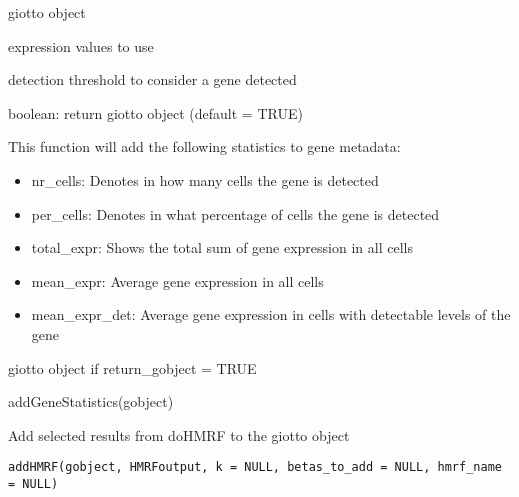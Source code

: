 \documentclass[a4paper]{book}
\begin{document}
%
\begin{Arguments}
\begin{ldescription}
\item[\code{gobject}] giotto object

\item[\code{expression\_values}] expression values to use

\item[\code{detection\_threshold}] detection threshold to consider a gene detected

\item[\code{return\_gobject}] boolean: return giotto object (default = TRUE)
\end{ldescription}
\end{Arguments}
%
\begin{Details}\relax
This function will add the following statistics to gene metadata:
\begin{itemize}

\item{} nr\_cells: Denotes in how many cells the gene is detected
\item{} per\_cells: Denotes in what percentage of cells the gene is detected
\item{} total\_expr: Shows the total sum of gene expression in all cells
\item{} mean\_expr: Average gene expression in all cells
\item{} mean\_expr\_det: Average gene expression in cells with detectable levels of the gene

\end{itemize}

\end{Details}
%
\begin{Value}
giotto object if return\_gobject = TRUE
\end{Value}
%
\begin{Examples}
\begin{ExampleCode}
    addGeneStatistics(gobject)
\end{ExampleCode}
\end{Examples}
%
\begin{Description}\relax
Add selected results from doHMRF to the giotto object
\end{Description}
%
\begin{Usage}
\begin{verbatim}
addHMRF(gobject, HMRFoutput, k = NULL, betas_to_add = NULL, hmrf_name = NULL)
\end{verbatim}
\end{Usage}
\end{document}
